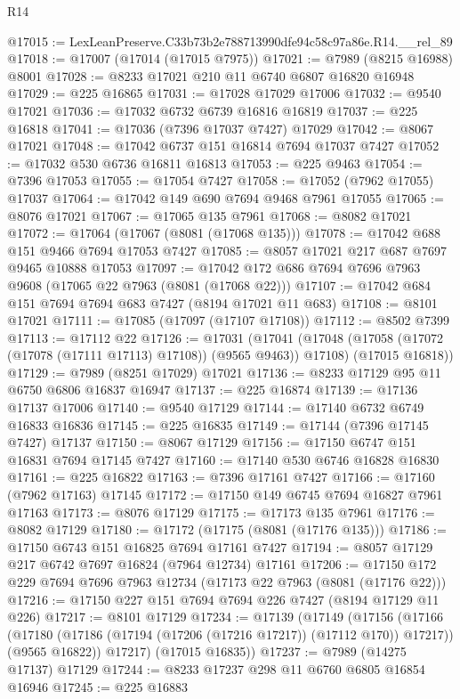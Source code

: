 \begin{lexlean}{R14}
\begin{coremodule}
@17015 := LexLeanPreserve.C33b73b2e788713990dfe94c58c97a86e.R14.__rel_89
@17018 := @17007 (@17014 (@17015 @7975))
@17021 := @7989 (@8215 @16988) @8001
@17028 := @8233 @17021 @210 @11 @6740 @6807 @16820 @16948
@17029 := @225 @16865
@17031 := @17028 @17029 @17006
@17032 := @9540 @17021
@17036 := @17032 @6732 @6739 @16816 @16819
@17037 := @225 @16818
@17041 := @17036 (@7396 @17037 @7427) @17029
@17042 := @8067 @17021
@17048 := @17042 @6737 @151 @16814 @7694 @17037 @7427
@17052 := @17032 @530 @6736 @16811 @16813
@17053 := @225 @9463
@17054 := @7396 @17053
@17055 := @17054 @7427
@17058 := @17052 (@7962 @17055) @17037
@17064 := @17042 @149 @690 @7694 @9468 @7961 @17055
@17065 := @8076 @17021
@17067 := @17065 @135 @7961
@17068 := @8082 @17021
@17072 := @17064 (@17067 (@8081 (@17068 @135)))
@17078 := @17042 @688 @151 @9466 @7694 @17053 @7427
@17085 := @8057 @17021 @217 @687 @7697 @9465 @10888 @17053
@17097 := @17042 @172 @686 @7694 @7696 @7963 @9608 (@17065 @22 @7963 (@8081 (@17068 @22)))
@17107 := @17042 @684 @151 @7694 @7694 @683 @7427 (@8194 @17021 @11 @683)
@17108 := @8101 @17021
@17111 := @17085 (@17097 (@17107 @17108))
@17112 := @8502 @7399
@17113 := @17112 @22
@17126 := @17031
    (@17041
      (@17048 (@17058 (@17072 (@17078 (@17111 @17113) @17108)) (@9565 @9463)) @17108)
      (@17015 @16818))
@17129 := @7989 (@8251 @17029) @17021
@17136 := @8233 @17129 @95 @11 @6750 @6806 @16837 @16947
@17137 := @225 @16874
@17139 := @17136 @17137 @17006
@17140 := @9540 @17129
@17144 := @17140 @6732 @6749 @16833 @16836
@17145 := @225 @16835
@17149 := @17144 (@7396 @17145 @7427) @17137
@17150 := @8067 @17129
@17156 := @17150 @6747 @151 @16831 @7694 @17145 @7427
@17160 := @17140 @530 @6746 @16828 @16830
@17161 := @225 @16822
@17163 := @7396 @17161 @7427
@17166 := @17160 (@7962 @17163) @17145
@17172 := @17150 @149 @6745 @7694 @16827 @7961 @17163
@17173 := @8076 @17129
@17175 := @17173 @135 @7961
@17176 := @8082 @17129
@17180 := @17172 (@17175 (@8081 (@17176 @135)))
@17186 := @17150 @6743 @151 @16825 @7694 @17161 @7427
@17194 := @8057 @17129 @217 @6742 @7697 @16824 (@7964 @12734) @17161
@17206 := @17150 @172 @229 @7694 @7696 @7963 @12734 (@17173 @22 @7963 (@8081 (@17176 @22)))
@17216 := @17150 @227 @151 @7694 @7694 @226 @7427 (@8194 @17129 @11 @226)
@17217 := @8101 @17129
@17234 := @17139
    (@17149
      (@17156
        (@17166
          (@17180 (@17186 (@17194 (@17206 (@17216 @17217)) (@17112 @170)) @17217))
          (@9565 @16822))
        @17217)
      (@17015 @16835))
@17237 := @7989 (@14275 @17137) @17129
@17244 := @8233 @17237 @298 @11 @6760 @6805 @16854 @16946
@17245 := @225 @16883

\end{coremodule}
\end{lexlean}
